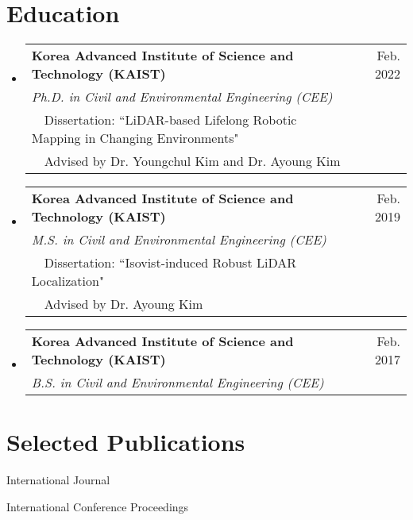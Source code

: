 \documentclass{cv} %
\makeatletter
\newcommand{\resumeSubheadingFourLines}[8]{
  \vspace{-2pt}\item
    \begin{tabular*}{0.97\textwidth}[t]{l@{\extracolsep{\fill}}r}
      \textbf{#1} & #2 \\
      \textit{\small#3} & \textit{\small #4} \\
      {\small#5} & \textit{\small #6} \\
      {\small#7} & \textit{\small #8} \\
    \end{tabular*}
    \vspace{-4pt}
}
\newcommand{\resumeSubheading}[4]{
  \vspace{-2pt}\item
    \begin{tabular*}{0.97\textwidth}[t]{l@{\extracolsep{\fill}}r}
      \textbf{#1} & #2 \\
      \textit{\small#3} & \textit{\small #4} \\
    \end{tabular*}
    \vspace{-4pt}
}
\newcommand{\resumeSubHeadingListStart}{\begin{itemize}[leftmargin=0.15in, label={}]}
\newcommand{\resumeSubHeadingListEnd}{\end{itemize}}
\makeatother
\begin{document}
\section{Education}
  \resumeSubHeadingListStart
    \resumeSubheadingFourLines
      {Korea Advanced Institute of Science and Technology (KAIST)}{Feb. 2022}
      {Ph.D. in Civil and Environmental Engineering (CEE)}{ } 
      {\ \ Dissertation: ``LiDAR-based Lifelong Robotic Mapping in Changing Environments"}{}
      {\ \ Advised by Dr. Youngchul Kim and Dr. Ayoung Kim}{}
    \vspace{1mm}
    \resumeSubheadingFourLines
      {Korea Advanced Institute of Science and Technology (KAIST)}{Feb. 2019}
      {M.S. in Civil and Environmental Engineering (CEE)}{ } 
      {\ \ Dissertation: ``Isovist-induced Robust LiDAR Localization"}{}
      {\ \ Advised by Dr. Ayoung Kim}{}
    \vspace{1mm}
    \resumeSubheading
      {Korea Advanced Institute of Science and Technology (KAIST)}{Feb. 2017}
      {B.S. in Civil and Environmental Engineering (CEE)}{ }
  \resumeSubHeadingListEnd

\section{Selected Publications}

\begin{pubSubsectionNum}{International Journal}
  \item {}
  \item {}
  \item {}
  \item {}
  \item {}
  \item {}
  \item {}
\end{pubSubsectionNum}

\vspace{-2mm}
\begin{pubSubsectionNum}{International Conference Proceedings}
  \item {}
  \item {}
  \item {}
  \item {}
  \item {}
  \item {}
  \item {}
  \item {}
  \item {}
  \item {}
\end{pubSubsectionNum}
\end{document}
